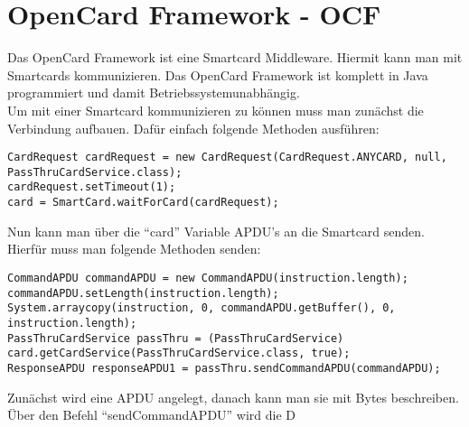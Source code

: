\documentclass[parskip]{scrartcl}
\begin{document}
\section{OpenCard Framework - OCF}
Das OpenCard Framework ist eine Smartcard Middleware. Hiermit kann man mit Smartcards kommunizieren. Das OpenCard Framework ist komplett in Java programmiert und damit Betriebssystemunabhängig.\\
Um mit einer Smartcard kommunizieren zu können muss man zunächst die Verbindung aufbauen. Dafür einfach folgende Methoden ausführen:
\begin{lstlisting}
CardRequest cardRequest = new CardRequest(CardRequest.ANYCARD, null, PassThruCardService.class);
cardRequest.setTimeout(1);
card = SmartCard.waitForCard(cardRequest);
\end{lstlisting}
Nun kann man über die \enquote{card} Variable APDU's an die Smartcard senden. Hierfür muss man folgende Methoden senden:
\begin{lstlisting}
CommandAPDU commandAPDU = new CommandAPDU(instruction.length);
commandAPDU.setLength(instruction.length);
System.arraycopy(instruction, 0, commandAPDU.getBuffer(), 0, instruction.length);
PassThruCardService passThru = (PassThruCardService) card.getCardService(PassThruCardService.class, true);
ResponseAPDU responseAPDU1 = passThru.sendCommandAPDU(commandAPDU);
\end{lstlisting}
Zunächst wird eine APDU angelegt, danach kann man sie mit Bytes beschreiben. Über den Befehl \enquote{sendCommandAPDU} wird die D
\end{document}
